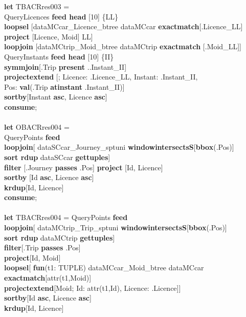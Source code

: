 \documentclass[a4paper]{article}
\newcommand{\op}[1]{\textbf{#1}}
\begin{document}
\begin{scriptsize}
\begin{tabbing}
\op{let} TBACRres003 =\\
\>QueryLicences \op{feed head} [10] \{LL\}\\
\>\>\op{loopsel} [dataMCcar\_Licence\_btree dataMCcar \op{exactmatch}[.Licence\_LL]\\
\>\>\>\op{project} [Licence, Moid] {LL}]\\
\>\>\>\op{loopjoin} [dataMCtrip\_Moid\_btree dataMCtrip \op{exactmatch} [.Moid\_LL]]\\
\>QueryInstants \op{feed head} [10] \{II\}\\
\>\op{symmjoin}[.Trip \op{present} ..Instant\_II]\\
\>\op{projectextend} [; Licence: .Licence\_LL, Instant: .Instant\_II,\\
\>\>\>\>Pos: \op{val}(.Trip \op{atinstant} .Instant\_II)]\\
\>\op{sortby}[Instant \op{asc}, Licence \op{asc}]\\
\op{consume};\\
\\
\op{let} OBACRres004 =\\
\>QueryPoints \op{feed}\\
\>\op{loopjoin}[ dataSCcar\_Journey\_sptuni \op{windowintersectsS}[\op{bbox}(.Pos)]\\
\>\>\op{sort rdup} dataSCcar \op{gettuples}]\\
\>\op{filter} [.Journey \op{passes} .Pos] \op{project} [Id, Licence]\\
\>\op{sortby} [Id \op{asc}, Licence \op{asc}]\\
\>\op{krdup}[Id, Licence]\\
\op{consume};\\
\\
\op{let} TBACRres004 = QueryPoints \op{feed}\\
\>\op{loopjoin}[ dataMCtrip\_Trip\_sptuni \op{windowintersectsS}[\op{bbox}(.Pos)]\\
\>\>\op{sort rdup} dataMCtrip \op{gettuples}]\\
\>\op{filter}[.Trip \op{passes} .Pos]\\
\>\op{project}[Id, Moid]\\
\>\op{loopsel}[ \op{fun}(t1: TUPLE) dataMCcar\_Moid\_btree dataMCcar \op{exactmatch}[attr(t1,Moid)]\\
\>\>\op{projectextend}[Moid; Id: attr(t1,Id), Licence: .Licence]]\\
\>\op{sortby}[Id \op{asc}, Licence \op{asc}]\\
\>\op{krdup}[Id, Licence]\\

\end{tabbing}
\end{scriptsize}
\end{document}
